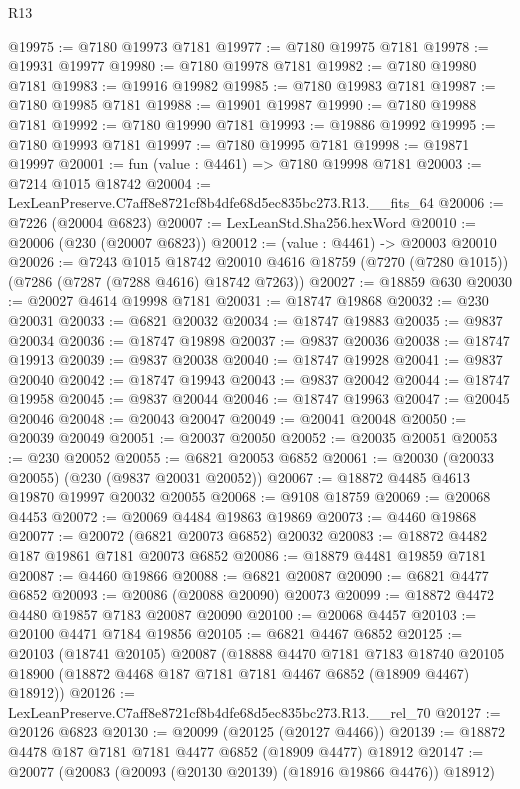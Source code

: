 \begin{lexlean}{R13}
\begin{coremodule}
@19975 := @7180 @19973 @7181
@19977 := @7180 @19975 @7181
@19978 := @19931 @19977
@19980 := @7180 @19978 @7181
@19982 := @7180 @19980 @7181
@19983 := @19916 @19982
@19985 := @7180 @19983 @7181
@19987 := @7180 @19985 @7181
@19988 := @19901 @19987
@19990 := @7180 @19988 @7181
@19992 := @7180 @19990 @7181
@19993 := @19886 @19992
@19995 := @7180 @19993 @7181
@19997 := @7180 @19995 @7181
@19998 := @19871 @19997
@20001 := fun (value : @4461) => @7180 @19998 @7181
@20003 := @7214 @1015 @18742
@20004 := LexLeanPreserve.C7aff8e8721cf8b4dfe68d5ec835bc273.R13.__fits_64
@20006 := @7226 (@20004 @6823)
@20007 := LexLeanStd.Sha256.hexWord
@20010 := @20006 (@230 (@20007 @6823))
@20012 := (value : @4461) -> @20003 @20010
@20026 := @7243
    @1015
    @18742
    @20010
    @4616
    @18759
    (@7270 (@7280 @1015))
    (@7286 (@7287 (@7288 @4616) @18742 @7263))
@20027 := @18859 @630
@20030 := @20027 @4614 @19998 @7181
@20031 := @18747 @19868
@20032 := @230 @20031
@20033 := @6821 @20032
@20034 := @18747 @19883
@20035 := @9837 @20034
@20036 := @18747 @19898
@20037 := @9837 @20036
@20038 := @18747 @19913
@20039 := @9837 @20038
@20040 := @18747 @19928
@20041 := @9837 @20040
@20042 := @18747 @19943
@20043 := @9837 @20042
@20044 := @18747 @19958
@20045 := @9837 @20044
@20046 := @18747 @19963
@20047 := @20045 @20046
@20048 := @20043 @20047
@20049 := @20041 @20048
@20050 := @20039 @20049
@20051 := @20037 @20050
@20052 := @20035 @20051
@20053 := @230 @20052
@20055 := @6821 @20053 @6852
@20061 := @20030 (@20033 @20055) (@230 (@9837 @20031 @20052))
@20067 := @18872 @4485 @4613 @19870 @19997 @20032 @20055
@20068 := @9108 @18759
@20069 := @20068 @4453
@20072 := @20069 @4484 @19863 @19869
@20073 := @4460 @19868
@20077 := @20072 (@6821 @20073 @6852) @20032
@20083 := @18872 @4482 @187 @19861 @7181 @20073 @6852
@20086 := @18879 @4481 @19859 @7181
@20087 := @4460 @19866
@20088 := @6821 @20087
@20090 := @6821 @4477 @6852
@20093 := @20086 (@20088 @20090) @20073
@20099 := @18872 @4472 @4480 @19857 @7183 @20087 @20090
@20100 := @20068 @4457
@20103 := @20100 @4471 @7184 @19856
@20105 := @6821 @4467 @6852
@20125 := @20103
    (@18741 @20105)
    @20087
    (@18888
      @4470
      @7181
      @7183
      @18740
      @20105
      @18900
      (@18872 @4468 @187 @7181 @7181 @4467 @6852 (@18909 @4467) @18912))
@20126 := LexLeanPreserve.C7aff8e8721cf8b4dfe68d5ec835bc273.R13.__rel_70
@20127 := @20126 @6823
@20130 := @20099 (@20125 (@20127 @4466))
@20139 := @18872 @4478 @187 @7181 @7181 @4477 @6852 (@18909 @4477) @18912
@20147 := @20077 (@20083 (@20093 (@20130 @20139) (@18916 @19866 @4476)) @18912)

\end{coremodule}
\end{lexlean}
